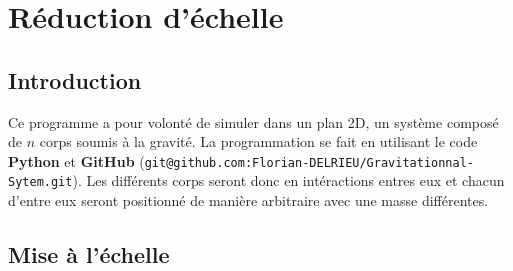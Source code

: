 \chapter*{Réduction d'échelle}
\section*{Introduction}
Ce programme a pour volonté de simuler dans un plan 2D, un système composé de $n$ corps soumis à la gravité. La programmation se fait en utilisant le code \textbf{Python} et \textbf{GitHub} (\verb!git@github.com:Florian-DELRIEU/Gravitationnal-Sytem.git!). Les différents corps seront donc en intéractions entres eux et chacun d'entre eux seront positionné de manière arbitraire avec une masse différentes.

\section*{Mise à l'échelle}
